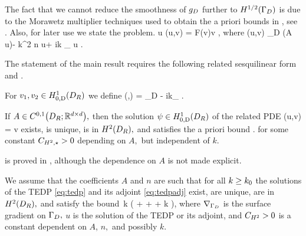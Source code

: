 The fact that we cannot reduce the smoothness of $g_{D}$ further to $\HhGD$ is due to the Morawetz multiplier techniques used to obtain the a priori bounds in \cite{GrPeSp:18}, see \cite[(iii), p. 2874]{GrPeSp:18}.
{}
Also, for later use we state the  problem.
\beq\label{eq:tedpadj}
 u \in \HozDDR\quad \tst\quad \aadj(u,v) = F(v)\quad \tfa v \in \HozDDR,
\eeq
where
\beqs
\aadj(u,v) \de \int_D \mleft(A \grad u\mright)\cdot \grad \vb - k^2 n u\vb + ik \int_{\GI} \trGI u \trGI \vb.
\eeqs

The statement of the main result requires the following related sesquilinear form and .

For $\vo, \vt \in \HozDDR$ we define
\beqs
\api(\vo,\vt) = \int_D  - ik\int_{\GI} \vo\vtbar.
\eeqs
\ede

\label{lem:relatedwp}
If $A \in \CzoDRRRdtd,$ then the solution $\psi \in \HozDDR$ of the related PDE
\beq\label{eq:relpde}
\api(u,v) = \quad \tfa\quad v \in \HozDDR
\eeq
exists, is unique, is in $\HtDR,$ and satisfies the a priori bound
\beqs
\NHtDR{\psi} \lesssim \CHtell {}.
\eeqs
for some constant $C_{H^{2},\star} > 0$ depending on $A,$ but independent of $k.$
\ele

 is proved in \cite{ChNiTo:18}, although the dependence on $A$ is not made explicit.
\ere


\label{ass:bound}
We assume that the coefficients $A$ and $n$ are such that for all $k \geq k_{0}$ the solutions of the TEDP \eqref{eq:tedp} and its adjoint \eqref{eq:tedpadj} exist, are unique, are in $\HtDR,$ and satisfy the bound
\beq\label{eq:hhbound}
 \lesssim \CHthh \,k \mleft( +  + \NLtGD{\gradGD \gD} + k \NLtGD{\gD}\mright),
\eeq
where $\nabla_{\Gamma_{D}}$ is the surface gradient on $\Gamma_{D},$ $u$ is the solution of the TEDP or its adjoint, and $C_{H^2} >0$ is a constant dependent on $A$, $n,$ and possibly $k.$
 \eas

